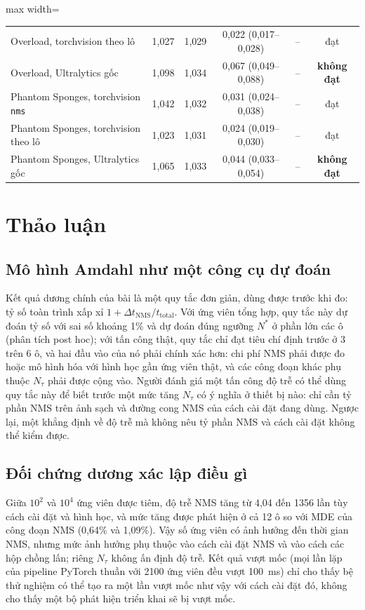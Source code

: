 \documentclass[a4paper,fleqn]{cas-dc}
\newcommand{\Ntau}{N_{\tau}}
\begin{document}
\begin{table}[!tp]
\begin{adjustbox}{max width=\textwidth}
\begin{tabular}{@{}lccccc@{}}
Overload, torchvision theo lô & 1,027 & 1,029 & 0,022 (0,017--0,028) & -- & đạt \\
Overload, Ultralytics gốc & 1,098 & 1,034 & 0,067 (0,049--0,088) & -- & \textbf{không đạt} \\
Phantom Sponges, torchvision \texttt{nms} & 1,042 & 1,032 & 0,031 (0,024--0,038) & -- & đạt \\
Phantom Sponges, torchvision theo lô & 1,023 & 1,031 & 0,024 (0,019--0,030) & -- & đạt \\
Phantom Sponges, Ultralytics gốc & 1,065 & 1,033 & 0,044 (0,033--0,054) & -- & \textbf{không đạt} \\
\bottomrule
\end{tabular}
\end{adjustbox}
\end{table}

\section{Thảo luận}
\label{sec:discussion}
\subsection{Mô hình Amdahl như một công cụ dự đoán}
Kết quả dương chính của bài là một quy tắc đơn giản, dùng được trước khi đo: tỷ số toàn trình xấp xỉ $1 + \Delta t_{\mathrm{NMS}}/t_{\mathrm{total}}$. Với ứng viên tổng hợp, quy tắc này dự đoán tỷ số với sai số khoảng 1\% và dự đoán đúng ngưỡng $N^{*}$ ở phần lớn các ô (phân tích post hoc); với tấn công thật, quy tắc chỉ đạt tiêu chí định trước ở 3 trên 6 ô, và hai đầu vào của nó phải chính xác hơn: chi phí NMS phải được đo hoặc mô hình hóa với hình học gần ứng viên thật, và các công đoạn khác phụ thuộc $\Ntau$ phải được cộng vào. Người đánh giá một tấn công độ trễ có thể dùng quy tắc này để biết trước một mức tăng $\Ntau$ có ý nghĩa ở thiết bị nào: chỉ cần tỷ phần NMS trên ảnh sạch và đường cong NMS của cách cài đặt đang dùng. Ngược lại, một khẳng định về độ trễ mà không nêu tỷ phần NMS và cách cài đặt không thể kiểm được.

\subsection{Đối chứng dương xác lập điều gì}
Giữa $10^2$ và $10^4$ ứng viên được tiêm, độ trễ NMS tăng từ 4,04 đến 1356 lần tùy cách cài đặt và hình học, và mức tăng được phát hiện ở cả 12 ô so với MDE của công đoạn NMS (0,64\% và 1,09\%). Vậy số ứng viên có ảnh hưởng đến thời gian NMS, nhưng mức ảnh hưởng phụ thuộc vào cách cài đặt NMS và vào cách các hộp chồng lấn; riêng $\Ntau$ không ấn định độ trễ. Kết quả vượt mốc (mọi lần lặp của pipeline PyTorch thuần với 2100 ứng viên đều vượt 100~ms) chỉ cho thấy bệ thử nghiệm có thể tạo ra một lần vượt mốc như vậy với cách cài đặt đó, không cho thấy một bộ phát hiện triển khai sẽ bị vượt mốc.
\end{document}
